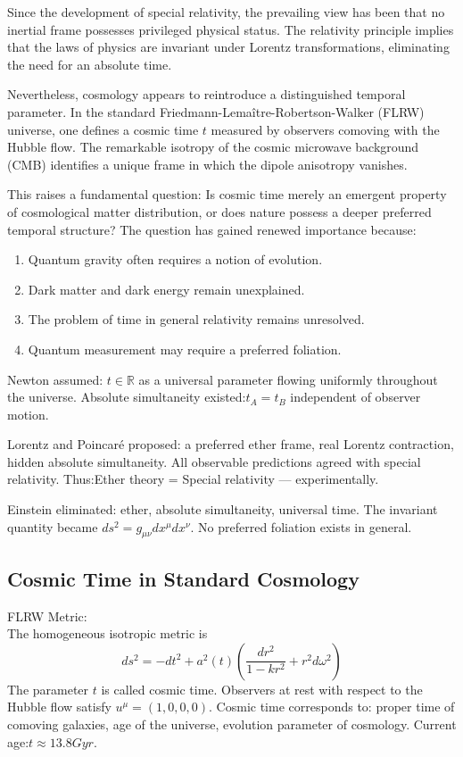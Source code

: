 Since the development of special relativity, the prevailing view has been
that no inertial frame possesses privileged physical status. The relativity
principle implies that the laws of physics are invariant under Lorentz
transformations, eliminating the need for an absolute time.

Nevertheless, cosmology appears to reintroduce a distinguished temporal
parameter. In the standard Friedmann-Lemaître-Robertson-Walker (FLRW)
universe, one defines a cosmic time $ t $  measured by observers comoving
with the Hubble flow. The remarkable isotropy of the cosmic microwave
background (CMB) identifies a unique frame in which the dipole 
anisotropy vanishes.

This raises a fundamental question:
Is cosmic time merely an emergent property of cosmological matter
distribution, or does nature possess a deeper preferred temporal structure?
The question has gained renewed importance because:
\begin{enumerate}
   \item Quantum gravity often requires a notion of evolution.
   \item Dark matter and dark energy remain unexplained.
   \item The problem of time in general relativity remains unresolved.
   \item Quantum measurement may require a preferred foliation.
\end{enumerate}

Newton assumed: $t \in \mathbb{R}$
as a universal parameter flowing uniformly throughout the universe.
Absolute simultaneity existed:$t_A=t_B$
independent of observer motion.

Lorentz and Poincaré proposed:
a preferred ether frame,
real Lorentz contraction,
hidden absolute simultaneity.
All observable predictions agreed with special relativity.
Thus:Ether theory = Special relativity ---
experimentally.

Einstein eliminated:
ether,
absolute simultaneity,
universal time.
The invariant quantity became $ds^2= g_{\mu \nu} dx^\mu dx^\nu$.
No preferred foliation exists in general.

 \subsection{Cosmic Time in Standard Cosmology}
FLRW Metric:\\
The homogeneous isotropic metric is
\begin{equation}
   \label {crt:cpt-flrw}
    ds^2=-dt^2+a^2(t) (\frac{dr^2}{1-k r^2}+r^2 d \omega^2)
\end{equation}
The parameter $ t $ is called cosmic time.
Observers at rest with respect to the Hubble flow satisfy
$ u^\mu=(1,0,0,0).$
Cosmic time corresponds to:
proper time of comoving galaxies,
age of the universe,
evolution parameter of cosmology.
Current age:$ t \approx 13.8 Gyr. $

